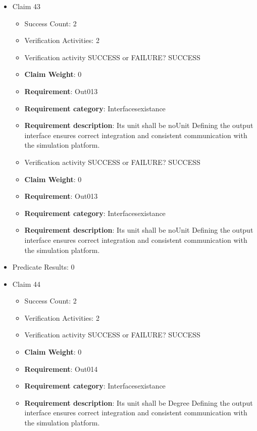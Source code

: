 \documentclass{article}
\begin{document}
\begin{itemize}
  				  \item Claim 43
				\begin{itemize}
			    	\item Success Count: 2 
			    	\item Verification Activities: 2
					\item Verification activity SUCCESS or FAILURE? SUCCESS
					\item \textbf{Claim Weight}: 0
						\item \textbf{Requirement}: Out013 
						\item \textbf{Requirement category}: Interfacesexistance 
						\item \textbf{Requirement description}: Its unit shall be noUnit Defining the output interface ensures correct integration and consistent communication with the simulation platform.
					
					\item Verification activity SUCCESS or FAILURE? SUCCESS
					\item \textbf{Claim Weight}: 0
						\item \textbf{Requirement}: Out013 
						\item \textbf{Requirement category}: Interfacesexistance 
						\item \textbf{Requirement description}: Its unit shall be noUnit Defining the output interface ensures correct integration and consistent communication with the simulation platform.
					
				\end{itemize}
				
									    
				\item Predicate Results: 0

  				  \item Claim 44
				\begin{itemize}
			    	\item Success Count: 2 
			    	\item Verification Activities: 2
					\item Verification activity SUCCESS or FAILURE? SUCCESS
					\item \textbf{Claim Weight}: 0
						\item \textbf{Requirement}: Out014 
						\item \textbf{Requirement category}: Interfacesexistance 
						\item \textbf{Requirement description}: Its unit shall be Degree Defining the output interface ensures correct integration and consistent communication with the simulation platform.
					

\end{itemize}
\end{itemize}
\end{document}
